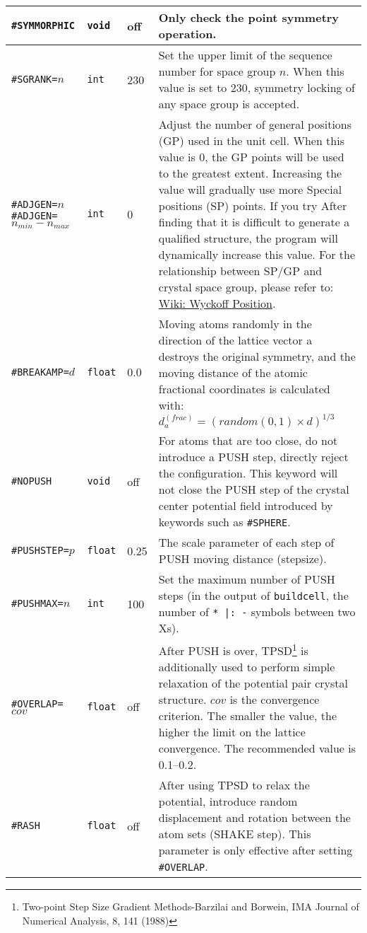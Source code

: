 \documentclass[a4paper, 10pt]{article}
\begin{document}
\begin{center}
\begin{longtable}{m{11em}|m{4em}<{\centering}|m{3em}<{\centering}|m{15em}}
\midrule
\verb|#SYMMORPHIC| & \verb|void| & off & Only check the point symmetry operation.\\
\midrule
\verb|#SGRANK=|\(n\) & \verb|int| & 230 & Set the upper limit of the sequence number for space group \(n\). When this value is set to 230, symmetry locking of any space group is accepted.\\
\midrule
\verb|#ADJGEN=|\(n\)\hspace{4em}\verb|#ADJGEN=|\(n_{min}-n_{max}\)  & \verb|int|  & 0 & Adjust the number of general positions (GP) used in the unit cell. When this value is 0, the GP points will be used to the greatest extent. Increasing the value will gradually use more Special positions (SP) points. If you try After finding that it is difficult to generate a qualified structure, the program will dynamically increase this value. For the relationship between SP/GP and crystal space group, please refer to: \href{https://en.wikipedia.org/wiki/Wyckoff_positions}{Wiki: Wyckoff Position}.\\
\midrule
\verb|#BREAKAMP=|\(d\) & \verb|float| & 0.0 & Moving atoms randomly in the direction of the lattice vector a destroys the original symmetry, and the moving distance of the atomic fractional coordinates is calculated with: \(d^{(frac)}_a=(random(0,1)\times{}d)^{1/3}\)\\
\midrule
\verb|#NOPUSH|& \verb|void| & off & For atoms that are too close, do not introduce a PUSH step, directly reject the configuration. This keyword will not close the PUSH step of the crystal center potential field introduced by keywords such as \verb|#SPHERE|.\\
\midrule
\verb|#PUSHSTEP=|\(p\)& \verb|float| & 0.25 & The scale parameter of each step of PUSH moving distance (stepsize).\\
\midrule
\verb|#PUSHMAX=|\(n\)& \verb|int| & 100 & Set the maximum number of PUSH steps (in the output of \verb|buildcell|, the number of \verb!* |: -! symbols between two Xs).\\
\midrule
\verb|#OVERLAP=|\(cov\)& \verb|float| & off & After PUSH is over, TPSD\footnote{Two-point Step Size Gradient Methods-Barzilai and Borwein, IMA Journal of Numerical Analysis, 8, 141 (1988)} is additionally used to perform simple relaxation of the potential pair crystal structure. \(cov \) is the convergence criterion. The smaller the value, the higher the limit on the lattice convergence. The recommended value is 0.1--0.2.\\
\midrule
\verb|#RASH|& \verb|float| & off & After using TPSD to relax the potential, introduce random displacement and rotation between the atom sets (SHAKE step). This parameter is only effective after setting \verb|#OVERLAP|.\\

\end{longtable}
\end{center}
\end{document}
